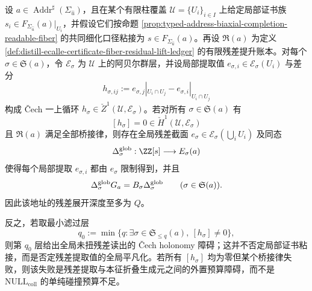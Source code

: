 \begin{theorem}[残差提升账本的证书纤维下降判据]\label{thm:distill-ecalle-certificate-fiber-residual-descent}
设 \(a\in\operatorname{Addr}^{\sharp}(\Sigma_{\hat u})\)，且在某个有限柱覆盖
\(\mathcal U=\{U_i\}_{i\in I}\) 上给定局部证书族
\(s_i\in F_{\Sigma_{\hat u}}(a)|_{U_i}\)，并假设它们按命题
\ref{prop:typed-address-biaxial-completion-readable-fiber} 的共同细化口径粘接为
\(s\in F_{\Sigma_{\hat u}}(a)\)。再设 \(\mathfrak R(a)\) 为定义
\ref{def:distill-ecalle-certificate-fiber-residual-lift-ledger} 的有限残差提升账本。对每个
\(\sigma\in\mathfrak S(a)\)，令 \(\mathcal E_\sigma\) 为 \(\mathcal U\) 上的阿贝尔群层，并设局部提取值
\(e_{\sigma,i}\in\mathcal E_\sigma(U_i)\) 与差分
\[
h_{\sigma,ij}:=e_{\sigma,j}|_{U_i\cap U_j}-e_{\sigma,i}|_{U_i\cap U_j}
\]
构成 Čech 一上循环
\(h_\sigma\in \check Z^1(\mathcal U,\mathcal E_\sigma)\)。若对所有
\(\sigma\in\mathfrak S(a)\) 有
\[
[h_\sigma]=0\in\check H^1(\mathcal U,\mathcal E_\sigma)
\]
且 \(\mathfrak R(a)\) 满足全部桥接律，则存在全局残差截面
\(e_\sigma\in\mathcal E_\sigma(\bigcup_iU_i)\) 及同态
\[
\Delta^{\rm glob}_\sigma:\ZZ[s]\longrightarrow E_\sigma(a)
\]
使得每个局部提取 \(e_{\sigma,i}\) 都由 \(e_\sigma\) 限制得到，并且
\[
\Delta^{\rm glob}_\sigma G_a=B_\sigma\Delta^{\rm glob}_\sigma
\qquad(\sigma\in\mathfrak S(a)).
\]
因此该地址的残差展开深度至多为 \(Q\)。

反之，若取最小滤过层
\[
q_0:=\min\{q:\exists\sigma\in\mathfrak S_{\le q}(a),\ [h_\sigma]\neq0\},
\]
则第 \(q_0\) 层给出全局未扭残差读出的 Čech holonomy 障碍；这并不否定局部证书粘接，而是否定残差提取值的全局平凡化。若所有 \([h_\sigma]\) 均为零但某个桥接律失败，则该失败是残差提取与本征折叠生成元之间的外置预算障碍，而不是 \(\mathrm{NULL}_{\mathrm{coll}}\) 的单纯碰撞预算不足。
\end{theorem}
